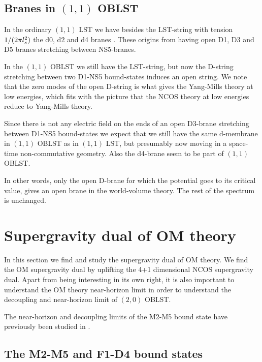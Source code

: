 \documentclass[a4paper,twoside,titlepage,12pt]{article}
\begin{document}
\subsection{Branes in $(1,1)$ OBLST}

In the ordinary $(1,1)$ LST we have besides the LST-string with
tension $1/(2\pi l_s^2)$ the d0, d2 and d4 branes \cite{Losev:1997hx}.
These origins from having open D1, D3 and D5 branes
stretching between NS5-branes.

In the $(1,1)$ OBLST we still have the LST-string, but now the
D-string stretching between two D1-NS5 bound-states induces
an open string. 
We note that the zero modes of the open D-string
is what gives the Yang-Mills
theory at low energies, which fits with the picture that the 
NCOS theory at low energies reduce to Yang-Mills theory.

Since there is not any electric field on the ends of an open D3-brane
stretching between D1-NS5 bound-states
 we expect that we still have the same d-membrane
in $(1,1)$ OBLST as in $(1,1)$ LST, but presumably now moving in a 
space-time non-commutative geometry.
Also the d4-brane seem to be part of $(1,1)$ OBLST.

In other words, only the open D-brane for which the potential goes to
its critical value, gives an open brane in the world-volume theory.
The rest of the spectrum is unchanged.


\section{Supergravity dual of OM theory}
\label{secOMdual}

In this section we find and study the supergravity dual of
OM theory.
We find the OM supergravity dual by uplifting the 4+1 dimensional
NCOS supergravity dual.
Apart from being interesting in its own right, it is also
important to understand the OM theory near-horizon limit 
in order to understand the decoupling and near-horizon 
limit of $(2,0)$ OBLST. 

The near-horizon and decoupling limits of the M2-M5 bound state
have previously been studied in \cite{Seiberg:1999vs,Maldacena:1999mh,Alishahiha:1999ci,Harmark:1999rb,Chakravarty:2000qd,Bergshoeff:2000jn,Kawamoto:2000zt,Gopakumar:2000ep,Bergshoeff:2000ai}.

\subsection{The M2-M5 and F1-D4 bound states}
\label{secM2M5F1D4}
\end{document}

